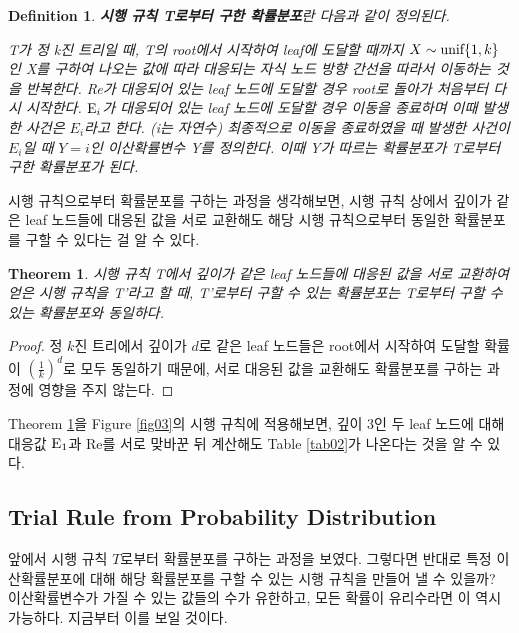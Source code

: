 \documentclass[11pt]{article}
\newtheorem*{definition}{Definition}
\newtheorem{theorem}{Theorem}
\begin{document}
\begin{definition}
\textbf{시행 규칙 T로부터 구한 확률분포}란 다음과 같이 정의된다.

T가 정 k진 트리일 때, T의 root에서 시작하여 leaf에 도달할 때까지 $X \sim \textnormal{unif}\{1, k\}$인 X를 구하여 나오는 값에 따라 대응되는 자식 노드 방향 간선을 따라서 이동하는 것을 반복한다. \textnormal{Re}가 대응되어 있는 leaf 노드에 도달할 경우 root로 돌아가 처음부터 다시 시작한다. $\textnormal{E}_i$가 대응되어 있는 leaf 노드에 도달할 경우 이동을 종료하며 이때 발생한 사건은 $E_{i}$라고 한다. (i는 자연수) 최종적으로 이동을 종료하였을 때 발생한 사건이 $E_{i}$일 때 $Y = i$인 이산확률변수 Y를 정의한다. 이때 Y가 따르는 확률분포가 T로부터 구한 확률분포가 된다.
\end{definition}

시행 규칙으로부터 확률분포를 구하는 과정을 생각해보면, 시행 규칙 상에서 깊이가 같은 leaf 노드들에 대응된 값을 서로 교환해도 해당 시행 규칙으로부터 동일한 확률분포를 구할 수 있다는 걸 알 수 있다.

\singlespacing
\begin{theorem}
시행 규칙 T에서 깊이가 같은 leaf 노드들에 대응된 값을 서로 교환하여 얻은 시행 규칙을 T'라고 할 때, T'로부터 구할 수 있는 확률분포는 T로부터 구할 수 있는 확률분포와 동일하다.
\label{thm01}
\end{theorem}
\doublespacing

\begin{proof}
정 $k$진 트리에서 깊이가 $d$로 같은 leaf 노드들은 root에서 시작하여 도달할 확률이 $\left(\frac{1}{k}\right)^{d}$로 모두 동일하기 때문에, 서로 대응된 값을 교환해도 확률분포를 구하는 과정에 영향을 주지 않는다.
\end{proof}

Theorem \ref{thm01}을 Figure \ref{fig03}의 시행 규칙에 적용해보면, 깊이 3인 두 leaf 노드에 대해 대응값 $\textnormal{E}_{1}$과 Re를 서로 맞바꾼 뒤 계산해도 Table \ref{tab02}가 나온다는 것을 알 수 있다.

\subsection{Trial Rule from Probability Distribution} \label{subsection3-2}
앞에서 시행 규칙 $T$로부터 확률분포를 구하는 과정을 보였다. 그렇다면 반대로 특정 이산확률분포에 대해 해당 확률분포를 구할 수 있는 시행 규칙을 만들어 낼 수 있을까? 이산확률변수가 가질 수 있는 값들의 수가 유한하고, 모든 확률이 유리수라면 이 역시 가능하다. 지금부터 이를 보일 것이다. 
\end{document}
